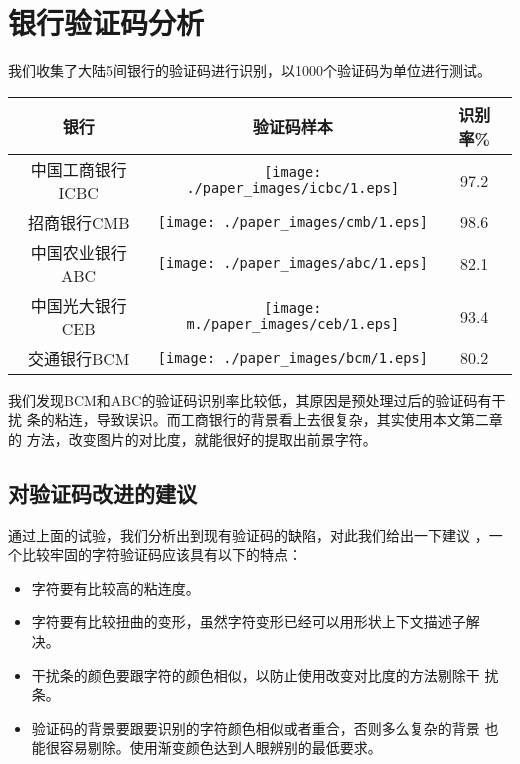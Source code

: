 \documentclass[a4paper,11pt]{article}%
\begin{document}
\section{银行验证码分析}
我们收集了大陆5间银行的验证码进行识别，以1000个验证码为单位进行测试。

\begin{tabular}{|*{3}{c|}}
\hline
银行 & 验证码样本 & 识别率\% \\\hline
中国工商银行ICBC &   \texttt{[image: ./paper\_images/icbc/1.eps]} & 97.2
\\\hline 
招商银行CMB & \texttt{[image: ./paper\_images/cmb/1.eps]} & 98.6 \\\hline
中国农业银行ABC & \texttt{[image: ./paper\_images/abc/1.eps]} & 82.1 \\\hline
中国光大银行CEB & \texttt{[image: m./paper\_images/ceb/1.eps]} & 93.4 \\\hline
交通银行BCM &  \texttt{[image: ./paper\_images/bcm/1.eps]} & 80.2 \\

\hline
\end{tabular}

我们发现BCM和ABC的验证码识别率比较低，其原因是预处理过后的验证码有干扰
条的粘连，导致误识。而工商银行的背景看上去很复杂，其实使用本文第二章的
方法，改变图片的对比度，就能很好的提取出前景字符。

\subsection{对验证码改进的建议}

通过上面的试验，我们分析出到现有验证码的缺陷，对此我们给出一下建议
，一个比较牢固的字符验证码应该具有以下的特点：

\begin{itemize}
\item 字符要有比较高的粘连度。
\item 字符要有比较扭曲的变形，虽然字符变形已经可以用形状上下文描述子解
  决。
\item 干扰条的颜色要跟字符的颜色相似，以防止使用改变对比度的方法剔除干
  扰条。
\item 验证码的背景要跟要识别的字符颜色相似或者重合，否则多么复杂的背景
  也能很容易剔除。使用渐变颜色达到人眼辨别的最低要求。
\end{itemize}


\end{document}
